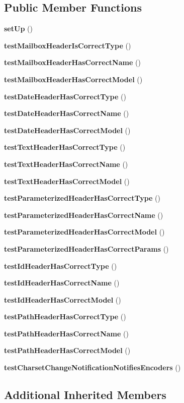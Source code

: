 \subsection*{Public Member Functions}
\begin{DoxyCompactItemize}
\item 
{\bf set\+Up} ()
\item 
{\bf test\+Mailbox\+Header\+Is\+Correct\+Type} ()
\item 
{\bf test\+Mailbox\+Header\+Has\+Correct\+Name} ()
\item 
{\bf test\+Mailbox\+Header\+Has\+Correct\+Model} ()
\item 
{\bf test\+Date\+Header\+Has\+Correct\+Type} ()
\item 
{\bf test\+Date\+Header\+Has\+Correct\+Name} ()
\item 
{\bf test\+Date\+Header\+Has\+Correct\+Model} ()
\item 
{\bf test\+Text\+Header\+Has\+Correct\+Type} ()
\item 
{\bf test\+Text\+Header\+Has\+Correct\+Name} ()
\item 
{\bf test\+Text\+Header\+Has\+Correct\+Model} ()
\item 
{\bf test\+Parameterized\+Header\+Has\+Correct\+Type} ()
\item 
{\bf test\+Parameterized\+Header\+Has\+Correct\+Name} ()
\item 
{\bf test\+Parameterized\+Header\+Has\+Correct\+Model} ()
\item 
{\bf test\+Parameterized\+Header\+Has\+Correct\+Params} ()
\item 
{\bf test\+Id\+Header\+Has\+Correct\+Type} ()
\item 
{\bf test\+Id\+Header\+Has\+Correct\+Name} ()
\item 
{\bf test\+Id\+Header\+Has\+Correct\+Model} ()
\item 
{\bf test\+Path\+Header\+Has\+Correct\+Type} ()
\item 
{\bf test\+Path\+Header\+Has\+Correct\+Name} ()
\item 
{\bf test\+Path\+Header\+Has\+Correct\+Model} ()
\item 
{\bf test\+Charset\+Change\+Notification\+Notifies\+Encoders} ()
\end{DoxyCompactItemize}
\subsection*{Additional Inherited Members}


